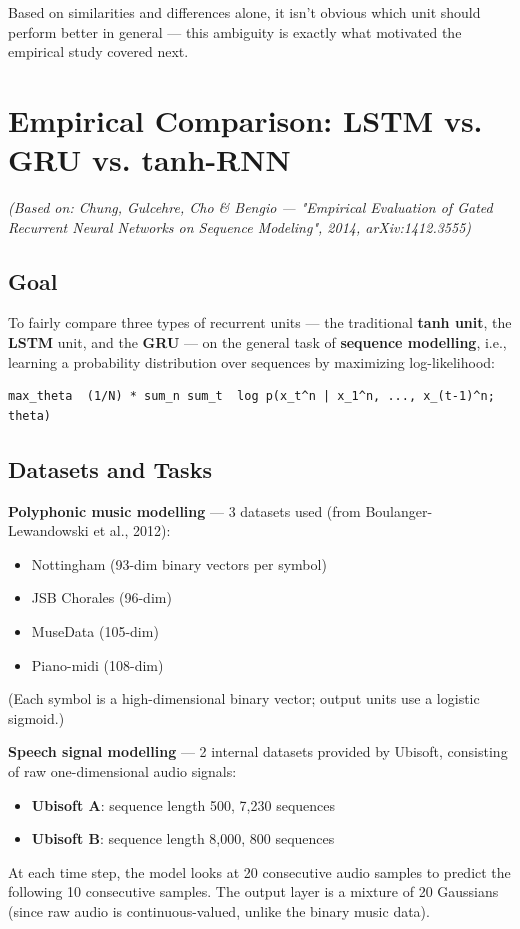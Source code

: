 \documentclass[12pt,openany]{book}
\theoremstyle{definition}
\theoremstyle{remark}
\begin{document}
Based on similarities and differences alone, it isn't obvious which unit should perform better in general --- this ambiguity is exactly what motivated the empirical study covered next.

\section{Empirical Comparison: LSTM vs. GRU vs. tanh-RNN}

\emph{(Based on: Chung, Gulcehre, Cho \& Bengio --- "Empirical Evaluation of Gated Recurrent Neural Networks on Sequence Modeling", 2014, arXiv:1412.3555)}

\subsection{Goal}

To fairly compare three types of recurrent units --- the traditional \textbf{tanh unit}, the \textbf{LSTM} unit, and the \textbf{GRU} --- on the general task of \textbf{sequence modelling}, i.e., learning a probability distribution over sequences by maximizing log-likelihood:

\begin{lstlisting}[style=notesCode]
max_theta  (1/N) * sum_n sum_t  log p(x_t^n | x_1^n, ..., x_(t-1)^n; theta)
\end{lstlisting}

\subsection{Datasets and Tasks}

\textbf{Polyphonic music modelling} --- 3 datasets used (from Boulanger-Lewandowski et al., 2012):
\begin{itemize}
\item Nottingham (93-dim binary vectors per symbol)
\item JSB Chorales (96-dim)
\item MuseData (105-dim)
\item Piano-midi (108-dim)

\end{itemize}
(Each symbol is a high-dimensional binary vector; output units use a logistic sigmoid.)

\textbf{Speech signal modelling} --- 2 internal datasets provided by Ubisoft, consisting of raw one-dimensional audio signals:
\begin{itemize}
\item \textbf{Ubisoft A}: sequence length 500, 7,230 sequences
\item \textbf{Ubisoft B}: sequence length 8,000, 800 sequences

\end{itemize}
At each time step, the model looks at 20 consecutive audio samples to predict the following 10 consecutive samples. The output layer is a mixture of 20 Gaussians (since raw audio is continuous-valued, unlike the binary music data).
\end{document}
